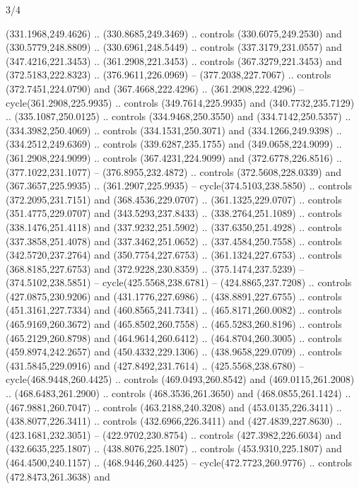 \begin{flagdescription}{3/4}
\begin{scope}[xshift=0.5\flaglength]
\begin{scope}[scale=0.002\flagwidth,yshift=146.5mm,xshift=-52mm]
\begin{scope}[y=0.80pt, x=0.80pt, yscale=-1, xscale=1, inner sep=0pt, outer sep=0pt]
\begin{scope}[cm={{1.03426,0.0,0.0,1.03426,(-229.44745,-87.97837)}}]
\begin{scope}[line join=round,line cap=round,line width=0.746\lw]
\begin{scope}[draw=black]
  (331.1968,249.4626) .. (330.8685,249.3469) .. controls (330.6075,249.2530) and
  (330.5779,248.8809) .. (330.6961,248.5449) .. controls (337.3179,231.0557) and
  (347.4216,221.3453) .. (361.2908,221.3453) .. controls (367.3279,221.3453) and
  (372.5183,222.8323) .. (376.9611,226.0969) -- (377.2038,227.7067) .. controls
  (372.7451,224.0790) and (367.4668,222.4296) .. (361.2908,222.4296) --
  cycle(361.2908,225.9935) .. controls (349.7614,225.9935) and
  (340.7732,235.7129) .. (335.1087,250.0125) .. controls (334.9468,250.3550) and
  (334.7142,250.5357) .. (334.3982,250.4069) .. controls (334.1531,250.3071) and
  (334.1266,249.9398) .. (334.2512,249.6369) .. controls (339.6287,235.1755) and
  (349.0658,224.9099) .. (361.2908,224.9099) .. controls (367.4231,224.9099) and
  (372.6778,226.8516) .. (377.1022,231.1077) -- (376.8955,232.4872) .. controls
  (372.5608,228.0339) and (367.3657,225.9935) .. (361.2907,225.9935) --
  cycle(374.5103,238.5850) .. controls (372.2095,231.7151) and
  (368.4536,229.0707) .. (361.1325,229.0707) .. controls (351.4775,229.0707) and
  (343.5293,237.8433) .. (338.2764,251.1089) .. controls (338.1476,251.4118) and
  (337.9232,251.5902) .. (337.6350,251.4928) .. controls (337.3858,251.4078) and
  (337.3462,251.0652) .. (337.4584,250.7558) .. controls (342.5720,237.2764) and
  (350.7754,227.6753) .. (361.1324,227.6753) .. controls (368.8185,227.6753) and
  (372.9228,230.8359) .. (375.1474,237.5239) -- (374.5102,238.5851) --
  cycle(425.5568,238.6781) -- (424.8865,237.7208) .. controls
  (427.0875,230.9206) and (431.1776,227.6986) .. (438.8891,227.6755) .. controls
  (451.3161,227.7334) and (460.8565,241.7341) .. (465.8171,260.0082) .. controls
  (465.9169,260.3672) and (465.8502,260.7558) .. (465.5283,260.8196) .. controls
  (465.2129,260.8798) and (464.9614,260.6412) .. (464.8704,260.3005) .. controls
  (459.8974,242.2657) and (450.4332,229.1306) .. (438.9658,229.0709) .. controls
  (431.5845,229.0916) and (427.8492,231.7614) .. (425.5568,238.6780) --
  cycle(468.9448,260.4425) .. controls (469.0493,260.8542) and
  (469.0115,261.2008) .. (468.6483,261.2900) .. controls (468.3536,261.3650) and
  (468.0855,261.1424) .. (467.9881,260.7047) .. controls (463.2188,240.3208) and
  (453.0135,226.3411) .. (438.8077,226.3411) .. controls (432.6966,226.3411) and
  (427.4839,227.8630) .. (423.1681,232.3051) -- (422.9702,230.8754) .. controls
  (427.3982,226.6034) and (432.6635,225.1807) .. (438.8076,225.1807) .. controls
  (453.9310,225.1807) and (464.4500,240.1157) .. (468.9446,260.4425) --
  cycle(472.7723,260.9776) .. controls (472.8473,261.3638) and

\end{scope}
\end{scope}
\end{scope}
\end{scope}
\end{scope}
\end{scope}
\end{flagdescription}
